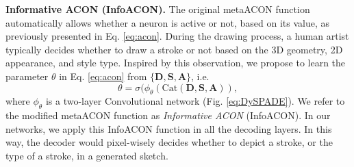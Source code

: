 \documentclass[10pt,twocolumn,letterpaper]{article}
\begin{document}


 


\textbf{Informative ACON (InfoACON).}
\label{ssec:dsaa}
The original metaACON function automatically allows whether a neuron is active or not, based on its value, as previously presented in Eq. \ref{eq:acon}. 
During the drawing process, a human artist typically decides whether to draw a stroke or not based on the 3D geometry, 2D appearance, and style type. Inspired by this observation, we propose to learn the parameter $\theta$ in Eq. \ref{eq:acon} from $\{ \mathbf{D}, \mathbf{S}, \mathbf{A} \}$, i.e.
\begin{equation}
		\theta = \sigma ( \phi_\theta(\mathrm{Cat}( \mathbf{D}, \mathbf{S}, \mathbf{A})),
\end{equation}
where $\phi_\theta$ is a two-layer Convolutional network (Fig. \ref{eq:DySPADE}). %
We refer to the modified metaACON function as \textit{Informative ACON} (InfoACON). In our networks, we apply this InfoACON function in all the decoding layers. In this way, the decoder would pixel-wisely decides whether to depict a stroke, or the type of a stroke, in a generated sketch. 


\end{document}
